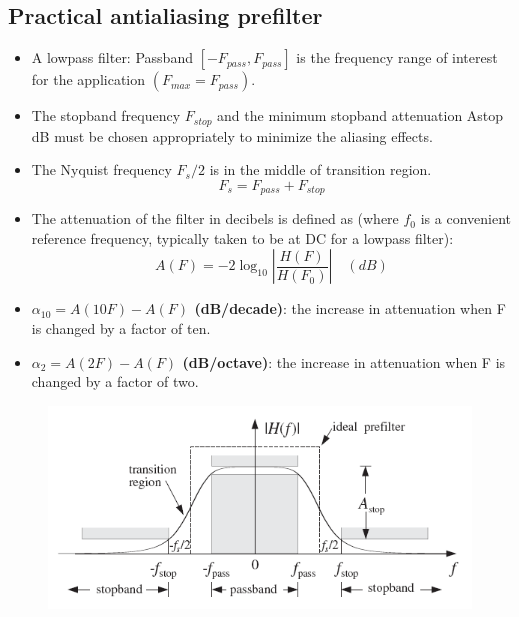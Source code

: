 \subsection{Practical antialiasing prefilter}
\begin{itemize}
    \item A lowpass filter: Passband $[-F_{pass}, F_{pass}]$ is the frequency range of interest for the application $(F_{max}=F_{pass})$.
    \item The stopband frequency $F_{stop}$ and the minimum stopband attenuation Astop dB must be chosen appropriately to minimize the aliasing effects.
    \item The Nyquist frequency $F_s/2$ is in the middle of transition region.
    \begin{equation*}
        F_s = F_{pass}+F_{stop}
    \end{equation*}
    \item The attenuation of the filter in decibels is defined as (where $f_0$ is a convenient reference frequency, typically taken to be at DC for a lowpass filter):
    \begin{equation*}
        A(F) = -2\log_{10}\left|\dfrac{H(F)}{H(F_0)} \right| \quad (dB)
    \end{equation*}
    \item \textbf{$\alpha_{10} =A(10F)-A(F)$ (dB/decade)}: the increase in attenuation when F is changed by a factor of ten.
    \item \textbf{$\alpha_2 =A(2F)-A(F)$ (dB/octave)}: the increase in attenuation when F is changed by a factor of two.
\end{itemize}
\begin{figure}[h!]
    \centering
    \includegraphics[width=0.5\linewidth]{img/11.png}
\end{figure}

